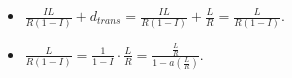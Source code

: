 \begin{pr}$ $
\begin{itemize}
\item $\frac{IL}{R(1-I)}+d_{trans}=\frac{IL}{R(1-I)}+\frac LR=\frac L{R(1-I)}$.
\item $\frac L{R(1-I)}=\frac1{1-I}\cdot\frac LR=\frac{\frac LR}{1-a(\frac LR)}$.
\end{itemize}
\end{pr}
